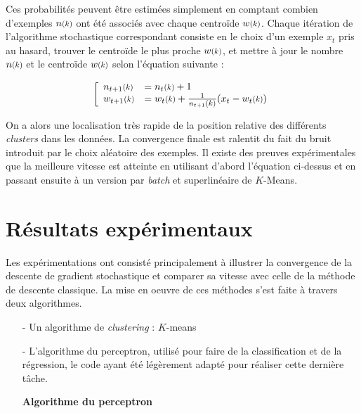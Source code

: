 \documentclass{article}
\begin{document}
Ces probabilités peuvent être estimées simplement en comptant combien d'exemples $n \scalebox{0.8}{$(k)$}$ ont été associés avec chaque centroïde $w \scalebox{0.8}{$(k)$}$. Chaque itération de l'algorithme stochastique correspondant consiste en le choix d'un exemple $x_t$ pris au hasard, trouver le centroïde le plus proche $w \scalebox{0.8}{$(k)$}$, et mettre à jour le nombre $n \scalebox{0.8}{$(k)$}$ et le centroïde $w \scalebox{0.8}{$(k)$}$ selon l'équation suivante :

\begin{equation*}
    \bigg [
        \begin{array}{ll}
            n_{t+1}\scalebox{0.8}{$(k)$} & = n_{t}\scalebox{0.8}{$(k)$} + 1\\
            w_{t+1}\scalebox{0.8}{$(k)$} & = w_{t}\scalebox{0.8}{$(k)$} + \frac{1}{n_{t+1}\scalebox{0.8}{$(k)$}}(x_t - w_{t}\scalebox{0.8}{$(k)$})
        \end{array}
\end{equation*}

On a alors une localisation très rapide de la position relative des différents \emph{clusters} dans les données. La convergence finale est ralentit du fait du bruit introduit par le choix aléatoire des exemples. Il existe des preuves expérimentales que la meilleure vitesse est atteinte en utilisant d'abord l'équation ci-dessus et en passant ensuite à un version par \emph{batch} et superlinéaire de $K$-Means.
\bigskip

\section{Résultats expérimentaux}

Les expérimentations ont consisté principalement à illustrer la convergence de la descente de gradient stochastique et comparer sa vitesse avec celle de la méthode de descente classique. La mise en oeuvre de ces méthodes s'est faite à travers deux algorithmes. 
\bigskip

\begin{itemize}
    \item [-] Un algorithme de \emph{clustering} : $K$-means
    \item [-] L'algorithme du perceptron, utilisé pour faire de la classification et de la régression, le code ayant été légèrement adapté pour réaliser cette dernière tâche. 
\end{itemize}
\bigskip

\begin{itemize}
    \item [\textbf{Algorithme du perceptron}]
\end{itemize}
\bigskip 
\end{document}
